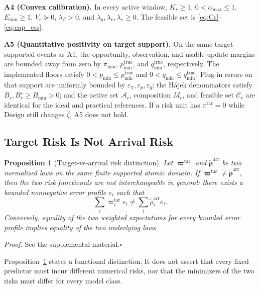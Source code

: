 \documentclass[letterpaper,journal]{IEEEtran}
\newtheorem{proposition}{Proposition}
\begin{document}
\noindent\textbf{A4 (Convex calibration).}
In every active window, $K_r\ge1$, $0<\alpha_{\max}\le1$, $E_{\min}\ge1$,
$V_r\succeq0$, $\lambda_{\beta}>0$, and
$\lambda_g,\lambda_v,\lambda_s\ge0$.  The feasible set is
\eqref{eq:Cr}--\eqref{eq:cap_ess}.

\noindent\textbf{A5 (Quantitative positivity on target support).}
On the same target-supported events as A1, the opportunity, observation,
and usable-update margins are bounded away from zero by
$\pi_{\min}$, $p_{\min}^{\mathrm{true}}$, and
$q_{\min}^{\mathrm{true}}$, respectively.  The implemented floors
satisfy $0<p_{\min}\le p_{\min}^{\mathrm{true}}$ and
$0<q_{\min}\le q_{\min}^{\mathrm{true}}$.  Plug-in errors on that
support are uniformly bounded by
$\varepsilon_\pi,\varepsilon_p,\varepsilon_q$; the H\'ajek
denominators satisfy $B_r,B_r^\star\ge B_{\min}>0$; and the active set
$\mathcal{A}_r$, composition $M_r$, and feasible set
$\mathcal{C}_r$ are identical for the ideal and practical references.
If a risk unit has $\pi^{\mathrm{tar}}=0$ while Design still changes
$\widehat\zeta$, A5 does not hold.

\subsection{Target Risk Is Not Arrival Risk}
\label{subsec:prop_risk}

\begin{proposition}[Target-vs-arrival risk distinction]
\label{prop:risk}
Let $\boldsymbol\varpi^{\mathrm{tar}}$ and
$\widetilde{\boldsymbol\rho}^{\mathrm{arr}}$ be two normalized laws on the same
finite supported atomic domain.  If
$\boldsymbol\varpi^{\mathrm{tar}}\neq\widetilde{\boldsymbol\rho}^{\mathrm{arr}}$,
then the two risk functionals are not interchangeable in general: there exists
a bounded nonnegative error profile $e_i$ such that
\begin{equation}
 \sum_i
 \varpi_i^{\mathrm{tar}}e_i
 \neq
 \sum_i
 \widetilde\rho_i^{\mathrm{arr}}e_i.
 \label{eq:prop1_nonidentity}
\end{equation}
Conversely, equality of the two weighted expectations for every bounded error
profile implies equality of the two underlying laws.
\end{proposition}

\noindent\emph{Proof.}
See the supplemental material.\hfill$\square$

Proposition~\ref{prop:risk} states a functional distinction.  It does not
assert that every fixed predictor must incur different numerical risks, nor
that the minimizers of the two risks must differ for every model class.
\end{document}
